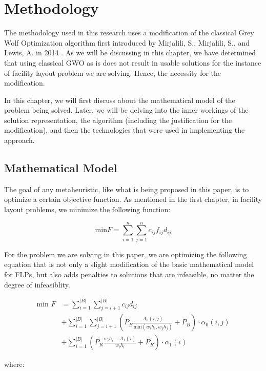 \chapter{Methodology}
The methodology used in this research uses a modification of the classical Grey Wolf Optimization algorithm first introduced by Mirjalili, S., Mirjalili, S., and Lewis, A. in 2014 \cite{Mirjalili2014}. As we will be discussing in this chapter, we have determined that using classical GWO as is does not result in usable solutions for the instance of facility layout problem we are solving. Hence, the necessity for the modification.

In this chapter, we will first discuss about the mathematical model of the problem being solved. Later, we will be delving into the inner workings of the solution representation, the algorithm (including the justification for the modification), and then the technologies that were used in implementing the approach.

\section{Mathematical Model}
The goal of any metaheuristic, like what is being proposed in this paper, is to optimize a certain objective function. As mentioned in the first chapter, in facility layout problems, we minimize the following function:

$$
\text{min} F = \sum_{i=1}^{n}\sum_{j=1}^{n}c_{ij}f_{ij}d_{ij}
$$

For the problem we are solving in this paper, we are optimizing the following equation that is not only a slight modification of the basic mathematical model for FLPs, but also adds penalties to solutions that are infeasible, no matter the degree of infeasiblity.

\begin{align*}
	\text{min }F &= \sum_{i=1}^{\left | B \right |}\sum_{j=i + 1}^{\left | B \right |}c_{ij}d_{ij} \\
	& + \sum_{i=1}^{\left | B \right |}\sum_{j=i + 1}^{\left | B \right |} \left ( P_{B}\frac{A_{0}(i, j)}{\text{min}(w_{i}h_{i}, w_{j}h_{j})} + P_{B} \right ) \cdot \alpha_{0}(i, j) \\
	& + \sum_{i=1}^{\left | B \right |}\left( P_{R}\frac{w_{i}h_{i} - A_{1}(i)}{w_{i}h_{i}} + P_{R} \right) \cdot \alpha_{1}(i)
\end{align*}

where:


